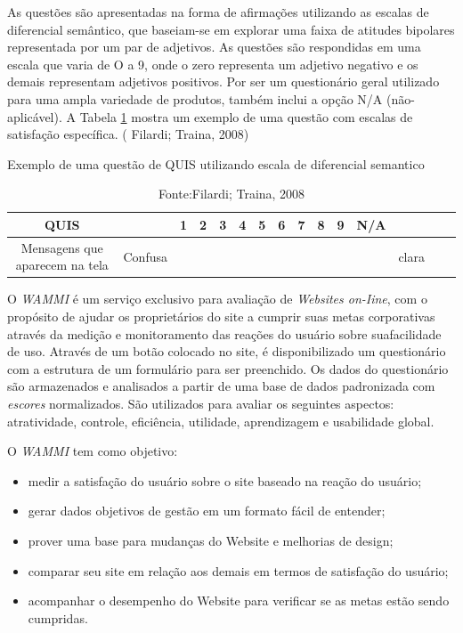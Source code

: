 	As questões são apresentadas na forma de afirmações
utilizando as escalas de diferencial semântico, que
baseiam-se em explorar uma faixa de atitudes bipolares
representada por um par de adjetivos. As questões são
respondidas em uma escala que varia de O a 9, onde o zero
representa um adjetivo negativo e os demais representam
adjetivos positivos. Por ser um questionário geral utilizado
para uma ampla variedade de produtos, também inclui a
opção N/A (não-aplicável). A Tabela \ref{tab:exemploQuestao} mostra um exemplo
de uma questão com escalas de satisfação específica. ( Filardi; Traina, 2008)

\begin{table}[H]
	{Exemplo de uma questão de QUIS utilizando escala de diferencial semantico}
	\centering
	\begin{tabular}{|c|c|c|c|c|c|c|c|c|c|c|c|c|c|c|} 

		\hline
		   QUIS &  & 1 & 2 & 3 & 4 & 5 & 6 & 7 & 8 & 9 & N/A &  \\
		\hline
		Mensagens que aparecem na tela & Confusa &  &  &  &  &  &  &  &  &  &  & clara \\ 

		\hline
	\end{tabular}
	\caption {Fonte:Filardi; Traina, 2008}
	\label{tab:exemploQuestao}

\end{table}

	O \textit{WAMMI} é um serviço exclusivo para avaliação de
\textit{Websites on-Iine}, com o propósito de ajudar os proprietários
do site a cumprir suas metas corporativas através da
medição e monitoramento das reações do usuário sobre
suafacilidade de uso. Através de um botão colocado no site,
é disponibilizado um questionário com a estrutura de um
formulário para ser preenchido. Os dados do questionário
são armazenados e analisados a partir de uma base de dados
padronizada com \textit{escores} normalizados. São utilizados para
avaliar os seguintes aspectos: atratividade, controle,
eficiência, utilidade, aprendizagem e usabilidade global.
	
	O \textit{WAMMI} tem como objetivo: 

\begin{itemize}
	\item medir a satisfação do usuário sobre o site baseado na
reação do usuário;
	\item gerar dados objetivos de gestão em um formato fácil de
entender;
	\item prover uma base para mudanças do Website e melhorias
de design;
	\item comparar seu site em relação aos demais em termos de
satisfação do usuário; 
	\item acompanhar o desempenho do Website para verificar se
as metas estão sendo cumpridas.
\end{itemize}

